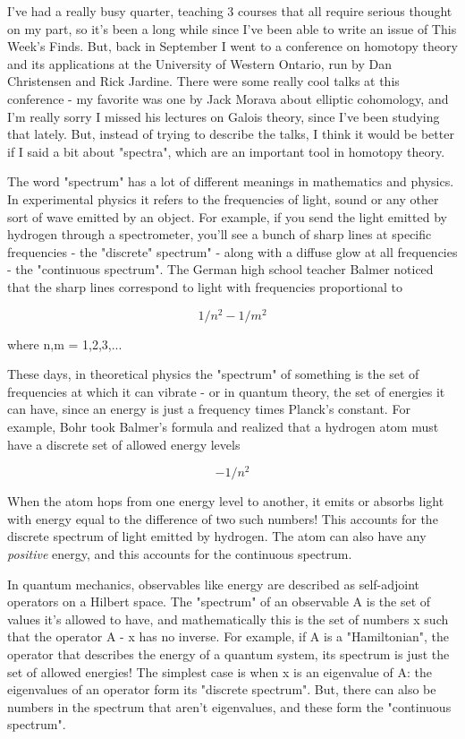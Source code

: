 



I've had a really busy quarter, teaching 3 courses that all require
serious thought on my part, so it's been a long while since I've been
able to write an issue of This Week's Finds.  But, back in September 
I went to a conference on homotopy theory and its applications at the
University of Western Ontario, run by Dan Christensen and Rick
Jardine.  There were some really cool talks at this conference - my
favorite was one by Jack Morava about elliptic cohomology, and I'm
really sorry I missed his lectures on Galois theory, since I've been
studying that lately.  But, instead of trying to describe the talks, 
I think it would be better if I said a bit about "spectra", 
which are an important tool in homotopy theory.

The word "spectrum" has a lot of different meanings in mathematics 
and physics.  In experimental physics it refers to the frequencies of
light, sound or any other sort of wave emitted by an object.  For
example, if you send the light emitted by hydrogen through a
spectrometer, you'll see a bunch of sharp lines at specific
frequencies - the "discrete" spectrum" - along with a diffuse glow at
all frequencies - the "continuous spectrum".  The German high school
teacher Balmer noticed that the sharp lines correspond to light with
frequencies proportional to

$$
1/n^{2} - 1/m^{2}
$$
    
where n,m = 1,2,3,...  

These days, in theoretical physics the "spectrum" of something is the
set of frequencies at which it can vibrate - or in quantum theory, the
set of energies it can have, since an energy is just a frequency times
Planck's constant.  For example, Bohr took Balmer's formula and
realized that a hydrogen atom must have a discrete set of allowed
energy levels

$$
-1/n^{2}
$$
    

When the atom hops from one energy level to another, it emits or
absorbs light with energy equal to the difference of two such numbers!
This accounts for the discrete spectrum of light emitted by hydrogen.
The atom can also have any \emph{positive} energy, and this accounts for
the continuous spectrum.

In quantum mechanics, observables like energy are described as
self-adjoint operators on a Hilbert space.  The "spectrum" of an
observable A is the set of values it's allowed to have, and
mathematically this is the set of numbers x such that the operator A - x 
has no inverse.  For example, if A is a "Hamiltonian", the operator
that describes the energy of a quantum system, its spectrum is just
the set of allowed energies!  The simplest case is when x is an
eigenvalue of A: the eigenvalues of an operator form its "discrete
spectrum".  But, there can also be numbers in the spectrum that aren't
eigenvalues, and these form the "continuous spectrum".

